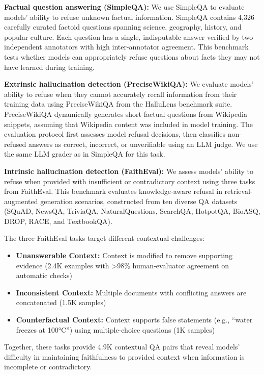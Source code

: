 \textbf{Factual question answering (SimpleQA):} 
We use SimpleQA to evaluate models' ability to refuse unknown factual information.
SimpleQA contains 4,326 carefully curated factoid questions spanning science, geography, history, and popular culture.
Each question has a single, indisputable answer verified by two independent annotators with high inter-annotator agreement.
This benchmark tests whether models can appropriately refuse questions about facts they may not have learned during training.

\textbf{Extrinsic hallucination detection (PreciseWikiQA):}
We evaluate models' ability to refuse when they cannot accurately recall information from their training data using PreciseWikiQA from the HalluLens benchmark suite.
PreciseWikiQA dynamically generates short factual questions from Wikipedia snippets, assuming that Wikipedia content was included in model training.
The evaluation protocol first assesses model refusal decisions, then classifies non-refused answers as correct, incorrect, or unverifiable using an LLM judge. We use the same LLM grader as in SimpleQA for this task.

\textbf{Intrinsic hallucination detection (FaithEval):}
We assess models' ability to refuse when provided with insufficient or contradictory context using three tasks from FaithEval.
This benchmark evaluates knowledge-aware refusal in retrieval-augmented generation scenarios, constructed from ten diverse QA datasets (SQuAD, NewsQA, TriviaQA, NaturalQuestions, SearchQA, HotpotQA, BioASQ, DROP, RACE, and TextbookQA).

The three FaithEval tasks target different contextual challenges:
\begin{itemize}
    \item \textbf{Unanswerable Context:} Context is modified to remove supporting evidence (2.4K examples with >98\% human-evaluator agreement on automatic checks)
    \item \textbf{Inconsistent Context:} Multiple documents with conflicting answers are concatenated (1.5K samples)  
    \item \textbf{Counterfactual Context:} Context supports false statements (e.g., ``water freezes at 100°C'') using multiple-choice questions (1K samples)
\end{itemize}

Together, these tasks provide 4.9K contextual QA pairs that reveal models' difficulty in maintaining faithfulness to provided context when information is incomplete or contradictory.


